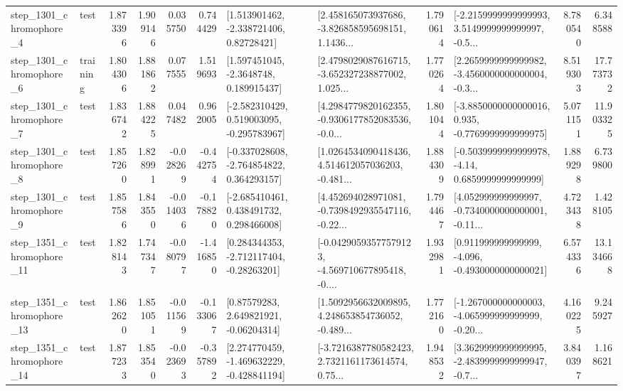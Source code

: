 \begin{tabular}{llrrrrllrlrr}
  step\_1301\_chromophore\_4 &      test &      1.873396 &    1.909146 &      0.035750 &  0.744429 &     [1.513901462, -2.338721406, 0.82728421] &  [2.458165073937686, -3.826858595698151, 1.1436... &       1.790614 &  [-2.2159999999999993, 3.5149999999999997, -0.5... &            8.780540 &          6.348588 \\
  step\_1301\_chromophore\_6 &  training &      1.804306 &    1.881862 &      0.077555 &  1.519693 &      [1.597451045, -2.3648748, 0.189915437] &  [2.4798029087616715, -3.652327238877002, 1.025... &       1.770264 &  [2.2659999999999982, -3.4560000000000004, -0.3... &            8.519303 &         17.773732 \\
  step\_1301\_chromophore\_7 &      test &      1.836742 &    1.884225 &      0.047482 &  0.962005 &   [-2.582310429, 0.519003095, -0.295783967] &  [4.2984779820162355, -0.9306177852083536, -0.0... &       1.801044 &  [-3.8850000000000016, 0.935, -0.7769999999999975] &            5.071151 &         11.903325 \\
  step\_1301\_chromophore\_8 &      test &      1.857260 &    1.828991 &     -0.028269 & -0.442754 &   [-0.337028608, -2.764854822, 0.364293157] &  [1.0264534090418436, 4.514612057036203, -0.481... &       1.884309 &   [-0.5039999999999978, -4.14, 0.6859999999999999] &            1.889298 &          6.739800 \\
  step\_1301\_chromophore\_9 &      test &      1.857586 &    1.843550 &     -0.014036 & -0.178820 &    [-2.685410461, 0.438491732, 0.298466008] &  [4.452694028971081, -0.7398492935547116, -0.22... &       1.794467 &  [4.052999999999997, -0.7340000000000001, -0.11... &            4.723438 &          1.428105 \\
 step\_1351\_chromophore\_11 &      test &      1.828143 &    1.747347 &     -0.080797 & -1.416850 &    [0.284344353, -2.712117404, -0.28263201] &  [-0.04290593577579123, -4.569710677895418, -0.... &       1.932981 &   [0.911999999999999, -4.096, -0.4930000000000021] &            6.574336 &         13.134668 \\
 step\_1351\_chromophore\_13 &      test &      1.862620 &    1.851051 &     -0.011569 & -0.133067 &      [0.87579283, 2.649821921, -0.06204314] &  [1.5092956632009895, 4.248653854736052, -0.489... &       1.772160 &  [-1.267000000000003, -4.065999999999999, -0.20... &            4.160225 &          9.245927 \\
 step\_1351\_chromophore\_14 &      test &      1.877233 &    1.853540 &     -0.023693 & -0.357892 &   [2.274770459, -1.469632229, -0.428841194] &  [-3.7216387780582423, 2.7321161173614574, 0.75... &       1.948532 &  [3.3629999999999995, -2.4839999999999947, -0.7... &            3.840397 &          1.168621 \\

\end{tabular}
